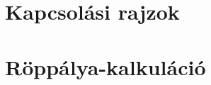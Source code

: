 \documentclass[12pt]{article}
\begin{document}
\appendix
{}

\section{Kapcsolási rajzok}

\section{Röppálya-kalkuláció}
\end{document}
